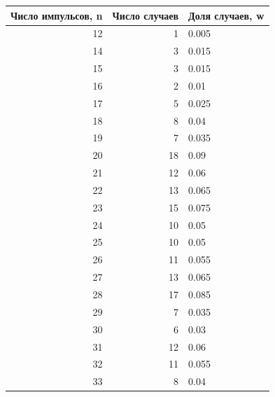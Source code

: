 \documentclass[12pt]{article}
\begin{document}
\begin{table}[H]
    \begin{center}
        \begin{tabular}{|r|r|l|}
            \hline
            Число импульсов, n & Число случаев & Доля случаев, w \\
            \hline
            12                 & 1             & 0.005           \\
            14                 & 3             & 0.015           \\
            15                 & 3             & 0.015           \\
            16                 & 2             & 0.01            \\
            17                 & 5             & 0.025           \\
            18                 & 8             & 0.04            \\
            19                 & 7             & 0.035           \\
            20                 & 18            & 0.09            \\
            21                 & 12            & 0.06            \\
            22                 & 13            & 0.065           \\
            23                 & 15            & 0.075           \\
            24                 & 10            & 0.05            \\
            25                 & 10            & 0.05            \\
            26                 & 11            & 0.055           \\
            27                 & 13            & 0.065           \\
            28                 & 17            & 0.085           \\
            29                 & 7             & 0.035           \\
            30                 & 6             & 0.03            \\
            31                 & 12            & 0.06            \\
            32                 & 11            & 0.055           \\
            33                 & 8             & 0.04            \\

\end{tabular}
\end{center}
\end{table}
\end{document}
